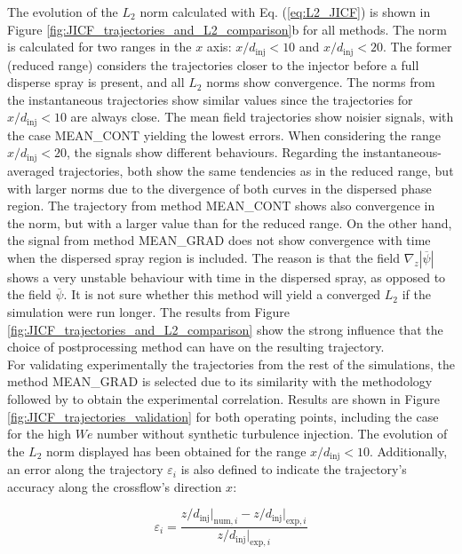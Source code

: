 The evolution of the $L_2$ norm calculated with Eq. (\ref{eq:L2_JICF}) is shown in Figure \ref{fig:JICF_trajectories_and_L2_comparison}b for all methods. The norm is calculated for two ranges in the $x$ axis: $x/d_\mathrm{inj} < 10$ and $x/d_\mathrm{inj} < 20$. The former (reduced range) considers the trajectories closer to the injector before a full disperse spray is present, and all $L_2$ norms show convergence. The norms from the instantaneous trajectories show similar values since the trajectories for $x/d_\mathrm{inj} < 10$ are always close. The mean field trajectories show noisier signals, with the case MEAN\_CONT yielding the lowest errors. When considering the range $x/d_\mathrm{inj} < 20$, the signals show different behaviours. Regarding the instantaneous-averaged trajectories, both show the same tendencies as in the reduced range, but with larger norms due to the divergence of both curves in the dispersed phase region. The trajectory from method MEAN\_CONT shows also convergence in the norm, but with a larger value than for the reduced range. On the other hand, the signal from method MEAN\_GRAD does not show convergence with time when the dispersed spray region is included. The reason is that the field $\nabla_z | \overline{\psi} |$ shows a very unstable behaviour with time in the dispersed spray, as opposed to the field $\overline{\psi}$. It is not sure whether this method will yield a converged $L_2$ if the simulation were run longer. The results from Figure \ref{fig:JICF_trajectories_and_L2_comparison} show the strong influence that the choice of postprocessing method can have on the resulting trajectory.  \\

For validating experimentally the trajectories from the rest of the simulations, the method MEAN\_GRAD is selected due to its similarity with the methodology followed by  to obtain the experimental correlation. Results are shown in Figure \ref{fig:JICF_trajectories_validation} for both operating points, including the case for the high $We$ number without synthetic turbulence injection. The evolution of the $L_2$ norm displayed has been obtained for the range $x/d_\mathrm{inj} < 10$. Additionally, an error along the trajectory  $\varepsilon_i$ is also defined to indicate the trajectory’s accuracy along the crossflow’s direction $x$:

\begin{equation}
\label{eq:error_along_trajectory}
\varepsilon_i  =  \frac{ z/d_\mathrm{inj} \Bigr|_{\mathrm{num},i} - z/d_\mathrm{inj} \Bigr|_{\mathrm{exp},i} }{ z/d_\mathrm{inj} \Bigr|_{\mathrm{exp},i} }
\end{equation}



